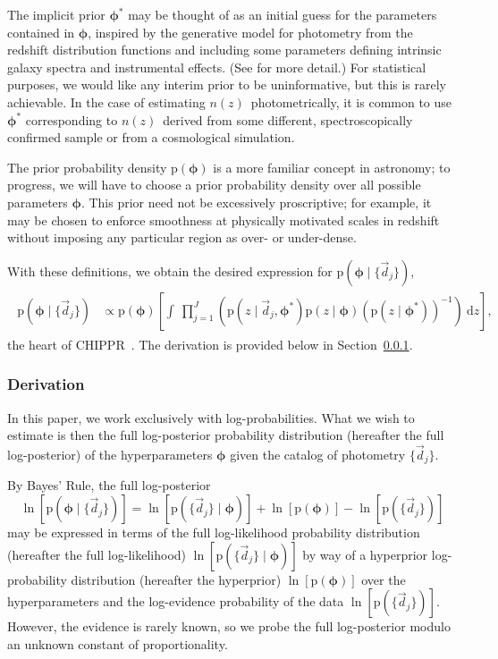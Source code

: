 \documentclass[iop]{emulateapj}
\newcommand{\Sect}[1]{Section~\ref{#1}}
\newcommand{\project}[1]{{\textsc{#1}}~}
\newcommand{\Chippr}{\project{CHIPPR}}
\newcommand{\nz}{$n(z)$}
\newcommand{\data}{\ensuremath{\vec{d}}}
\newcommand{\pr}[1]{\ensuremath{\mathrm{p}(#1)}}
\newcommand{\gvn}{\mid}%
\newcommand{\integral}[2]{\ensuremath{\int\ #1\ \mathrm{d} #2}}
\newcommand{\bvec}[1]{{\ensuremath{\boldsymbol{#1}}}}
\newcommand{\ndphi}{\bvec{\phi}}
\begin{document}
The implicit prior $\ndphi^{*}$ may be thought of as an initial guess for the 
parameters contained in $\ndphi$, inspired by the generative model for 
photometry from the redshift distribution functions and including some 
parameters defining intrinsic galaxy spectra and instrumental effects. 
(See \citealt{benitez_bayesian_2000} for more detail.)  
For statistical purposes, we would like any interim prior to be uninformative, 
but this is rarely achievable.  
In the case of estimating \nz\ photometrically, it is common to use 
$\ndphi^{*}$ corresponding to \nz\ derived from some different, 
spectroscopically confirmed sample or from a cosmological simulation.

The prior probability density $\pr{\ndphi}$ is a more familiar concept in 
astronomy; to progress, we will have to choose a prior probability density over 
all possible parameters $\ndphi$.
This prior need not be excessively proscriptive; for example, it may be chosen 
to enforce smoothness at physically motivated scales in redshift without 
imposing any particular region as over- or under-dense.

With these definitions, we obtain the desired expression for $\pr{\ndphi \gvn 
\{\data_{j}\}}$,
\begin{align}
\begin{split}
\label{eqn:fullpost}
\pr{\ndphi \gvn \{\data_{j}\}} & \propto 
\pr{\ndphi}\left[\integral{\prod_{j=1}^{J} \left(\pr{z \gvn \data_{j}, 
\ndphi^{*}}\pr{z \gvn \ndphi}(\pr{z \gvn \ndphi^{*}})^{-1}\right)}{z}\right] ,
\end{split}
\end{align}
the heart of \Chippr.
The derivation is provided below in \Sect{app:math}.

\subsubsection{Derivation}
\label{app:math}


In this paper, we work exclusively with log-probabilities.  
What we wish to estimate is then the full log-posterior probability 
distribution (hereafter the full log-posterior) of the hyperparameters $\ndphi$ 
given the catalog of photometry $\{\data_{j}\}$.

By Bayes' Rule, the full log-posterior
\begin{equation}
\label{eqn:basicbayes}
\ln[\pr{\ndphi \gvn \{\data_{j}\}}] = \ln[\pr{\{\data_{j}\} \gvn \ndphi}] + 
\ln[\pr{\ndphi}] - \ln[\pr{\{\data_{j}\}}]
\end{equation}
may be expressed in terms of the full log-likelihood probability distribution 
(hereafter the full log-likelihood) $\ln[\pr{\{\data_{j}\} \gvn \ndphi}]$ by 
way of a hyperprior log-probability distribution (hereafter the hyperprior) 
$\ln[\pr{\ndphi}]$ over the hyperparameters and the log-evidence probability of 
the data $\ln[\pr{\{\data_{j}\}}]$.
However, the evidence is rarely known, so we probe the full log-posterior 
modulo an unknown constant of proportionality.
\end{document}
